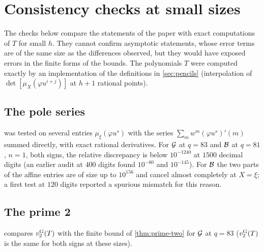 \section{Consistency checks at small sizes}\label{app:consistency}

The checks below compare the statements of the paper with exact computations of $T$ for small
$h$. They cannot confirm asymptotic statements, whose error terms are of the same size as the
differences observed, but they would have exposed errors in the finite forms of the bounds.
The polynomials $T$ were computed exactly by an implementation of the definitions in
\cref{sec:pencils} (interpolation of $\det[\mu_X(\varphi u^{i+j})]$ at $h+1$ rational points).

\subsection{The pole series}
 was tested on several entries $\mu_\xi(\varphi u^s)$ with the series
$\sum_mw^m(\varphi u^s)'(m)$ summed directly, with exact rational derivatives. For $\mathcal{G}$ at
$q=83$ and $\mathcal{B}$ at $q=81$, $n=1$, both signs, the relative discrepancy is below $10^{-1240}$ at
$1500$ decimal digits (an earlier audit at $400$ digits found $10^{-60}$ and $10^{-145}$). For
$\mathcal{B}$ the two parts of the affine entries are of size up to $10^{156}$ and cancel almost
completely at $X=\xi$; a first test at $120$ digits reported a spurious mismatch for this reason.

\subsection{The prime 2}
 compares $v_{2}^{\mathrm{G}}(T)$ with the finite bound of \cref{thm:prime-two} for $\mathcal{G}$ at
$q=83$ ($v_{2}^{\mathrm{G}}(T)$ is the same for both signs at these sizes).

